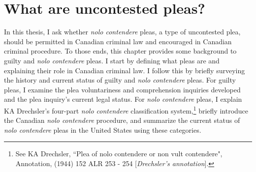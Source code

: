 \chapter{What are uncontested pleas?}

\setcounter{footnote}{15}

In this thesis, I ask whether \textit{nolo contendere} pleas, a type of uncontested plea, should be permitted in Canadian criminal law and encouraged in Canadian criminal procedure. To those ends, this chapter provides some background to guilty and \textit{nolo contendere} pleas. I start by defining what pleas are and explaining their role in Canadian criminal law. I follow this by briefly surveying the history and current status of guilty and \textit{nolo contendere} pleas. For guilty pleas, I examine the plea voluntariness and comprehension inquiries developed and the plea inquiry's current legal status. For \textit{nolo contendere} pleas, I explain KA Drechsler's four-part \textit{nolo contendere} classification system,\footnote{See KA Drechsler, ``Plea of nolo contendere or non vult contendere", Annotation, (1944) 152 ALR 253 - 254 [\textit{Drechsler's annotation}].} briefly introduce the Canadian \textit{nolo contendere} procedure, and summarize the current status of \textit{nolo contendere} pleas in the United States using these categories.


